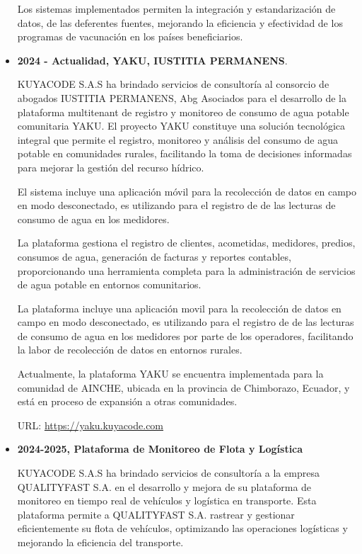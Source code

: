 \begin{itemize}
        Los sistemas implementados permiten la integración y estandarización de datos, de las deferentes fuentes, mejorando la eficiencia y efectividad de los programas de vacunación en los países beneficiarios.
    
    \item \textbf{2024 - Actualidad, YAKU, IUSTITIA PERMANENS}.

        KUYACODE S.A.S ha brindado servicios de consultoría al consorcio de abogados IUSTITIA PERMANENS, Abg Asociados para el desarrollo de la plataforma multitenant de registro y monitoreo de consumo de agua potable comunitaria YAKU. El proyecto YAKU constituye una solución tecnológica integral que permite el registro, monitoreo y análisis del consumo de agua potable en comunidades rurales, facilitando la toma de decisiones informadas para mejorar la gestión del recurso hídrico.

        El sistema incluye una aplicación móvil para la recolección de datos en campo en modo desconectado, es utilizando para el registro de de las lecturas de consumo de agua en los medidores. 

        La plataforma gestiona el registro de clientes, acometidas, medidores, predios, consumos de agua, generación de facturas y reportes contables, proporcionando una herramienta completa para la administración de servicios de agua potable en entornos comunitarios.

        La plataforma incluye una aplicación movil para la recolección de datos en campo en modo desconectado, es utilizando para el registro de de las lecturas de consumo de agua en los medidores por parte de los operadores, facilitando la labor de recolección de datos en entornos rurales.

        Actualmente, la plataforma YAKU se encuentra implementada para la comunidad de AINCHE, ubicada en la provincia de Chimborazo, Ecuador, y está en proceso de expansión a otras comunidades.

        URL: \url{https://yaku.kuyacode.com}

    \item \textbf{2024-2025, Plataforma de Monitoreo de Flota y Logística}

        KUYACODE S.A.S ha brindado servicios de consultoría a la empresa QUALITYFAST S.A. en el desarrollo y mejora de su plataforma de monitoreo en tiempo real de vehículos y logística en transporte. Esta plataforma permite a QUALITYFAST S.A. rastrear y gestionar eficientemente su flota de vehículos, optimizando las operaciones logísticas y mejorando la eficiencia del transporte.


\end{itemize}

